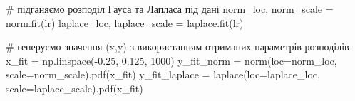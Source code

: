 \documentclass[
  letterpaper,
]{report}
\newenvironment{Shaded}{\begin{snugshade}}{\end{snugshade}}
\newcommand{\CommentTok}[1]{\textcolor[rgb]{0.37,0.37,0.37}{#1}}
\newcommand{\DecValTok}[1]{\textcolor[rgb]{0.68,0.00,0.00}{#1}}
\newcommand{\FloatTok}[1]{\textcolor[rgb]{0.68,0.00,0.00}{#1}}
\newcommand{\NormalTok}[1]{\textcolor[rgb]{0.00,0.23,0.31}{#1}}
\newcommand{\OperatorTok}[1]{\textcolor[rgb]{0.37,0.37,0.37}{#1}}
\begin{document}
\begin{Shaded}
\begin{Highlighting}[]
\CommentTok{\# підганяємо розподіл Гауса та Лапласа під дані}
\NormalTok{norm\_loc, norm\_scale }\OperatorTok{=}\NormalTok{ norm.fit(lr)}
\NormalTok{laplace\_loc, laplace\_scale }\OperatorTok{=}\NormalTok{ laplace.fit(lr)}

\CommentTok{\# генеруємо значення (x,y) з використанням отриманих параметрів розподілів}
\NormalTok{x\_fit }\OperatorTok{=}\NormalTok{ np.linspace(}\OperatorTok{{-}}\FloatTok{0.25}\NormalTok{, }\FloatTok{0.125}\NormalTok{, }\DecValTok{1000}\NormalTok{)}
\NormalTok{y\_fit\_norm }\OperatorTok{=}\NormalTok{ norm(loc}\OperatorTok{=}\NormalTok{norm\_loc, scale}\OperatorTok{=}\NormalTok{norm\_scale).pdf(x\_fit)}
\NormalTok{y\_fit\_laplace }\OperatorTok{=}\NormalTok{ laplace(loc}\OperatorTok{=}\NormalTok{laplace\_loc, scale}\OperatorTok{=}\NormalTok{laplace\_scale).pdf(x\_fit)}
\end{Highlighting}
\end{Shaded}
\end{document}
